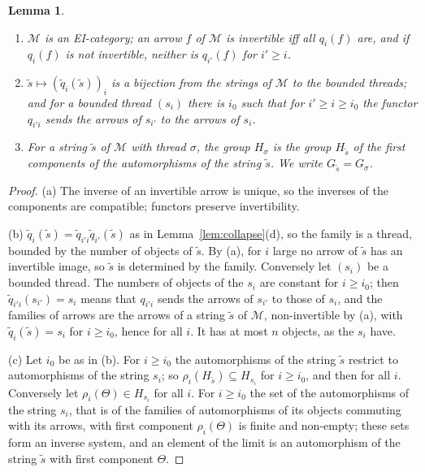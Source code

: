 \documentclass[11pt]{amsart}
\newtheorem{lem}[thm]{Lemma}
\theoremstyle{definition}
\newcommand{\cM}{\mathcal M}
\begin{document}
\begin{lem}\label{lem:threads}
\begin{enumerate}
\item[(a)] $\cM$ is an EI-category; an arrow $f$ of $\cM$ is
invertible iff all $q_i(f)$ are, and if $q_i(f)$ is not invertible,
neither is $q_{i'}(f)$ for $i'\ge i$.
\item[(b)] $\tilde s\mapsto(\tilde q_i(\tilde s))_i$ is a bijection
from the strings of $\cM$ to the bounded threads; and for a bounded
thread $(s_i)$ there is $i_0$ such that for $i'\ge i\ge i_0$ the
functor $q_{i'i}$ sends the arrows of $s_{i'}$ to the arrows of $s_i$.
\item[(c)] For a string $\tilde s$ of $\cM$ with thread $\sigma$, the
group $H_\sigma$ is the group $H_{\tilde s}$ of the first components
of the automorphisms of the string $\tilde s$. We write $G_{\tilde
s}=G_\sigma$.
\end{enumerate}
\end{lem}
\begin{proof}
(a) The inverse of an invertible arrow is unique, so the inverses of
the components are compatible; functors preserve invertibility.

(b) $\tilde q_i(\tilde s)=\tilde q_{i'i}\tilde q_{i'}(\tilde s)$ as in
Lemma~\ref{lem:collapse}(d), so the family is a thread, bounded by the
number of objects of $\tilde s$. By (a), for $i$ large no arrow of
$\tilde s$ has an invertible image, so $\tilde s$ is determined by the
family. Conversely let $(s_i)$ be a bounded thread. The numbers of
objects of the $s_i$ are constant for $i\ge i_0$; then $\tilde
q_{i'i}(s_{i'})=s_i$ means that $q_{i'i}$ sends the arrows of $s_{i'}$
to those of $s_i$, and the families of arrows are the arrows of a
string $\tilde s$ of $\cM$, non-invertible by (a), with $\tilde
q_i(\tilde s)=s_i$ for $i\ge i_0$, hence for all $i$. It has at most
$n$ objects, as the $s_i$ have.

(c) Let $i_0$ be as in (b). For $i\ge i_0$ the automorphisms of the
string $\tilde s$ restrict to automorphisms of the string $s_i$; so
$\rho_i(H_{\tilde s})\subseteq H_{s_i}$ for $i\ge i_0$, and then for
all $i$. Conversely let $\rho_i(\Theta)\in H_{s_i}$ for all $i$. For
$i\ge i_0$ the set of the automorphisms of the string $s_i$, that is
of the families of automorphisms of its objects commuting with its
arrows, with first component $\rho_i(\Theta)$ is finite and non-empty;
these sets form an inverse system, and an element of the limit is an
automorphism of the string $\tilde s$ with first component $\Theta$.
\end{proof}
\end{document}
